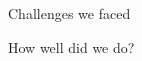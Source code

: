 \documentclass[final]{beamer}
\newlength{\onecolwid}
\begin{document}
\begin{frame}[t]
\begin{columns}[t]
\begin{column}{\onecolwid}
\begin{block}{Challenges we faced}
            \end{block}
            \vspace{20mm}
            \begin{block}{How well did we do?}
                    
            \end{block}
            
		    
    \end{column}

      		
 \end{columns}
\end{frame}
\end{document}
